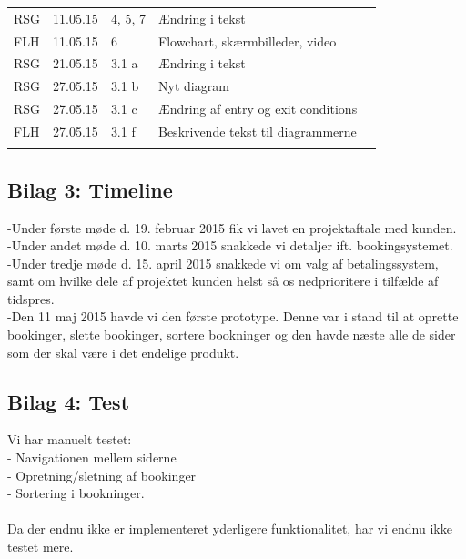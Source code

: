 \documentclass[12pt,a4paper]{article}
\begin{document}
\begin{table}[h]
\begin{tabular}{lllll}
\multicolumn{1}{|l|}{RSG}     & \multicolumn{1}{l|}{11.05.15}     & \multicolumn{1}{l|}{4, 5, 7}       & \multicolumn{1}{l|}{Ændring i tekst}        &  \\ \cline{1-4}
\multicolumn{1}{|l|}{FLH}     & \multicolumn{1}{l|}{11.05.15}     & \multicolumn{1}{l|}{6}       & \multicolumn{1}{l|}{Flowchart, skærmbilleder, video}        &  \\ \cline{1-4}
\multicolumn{1}{|l|}{RSG}     & \multicolumn{1}{l|}{21.05.15}     & \multicolumn{1}{l|}{3.1 a}       & \multicolumn{1}{l|}{Ændring i tekst}        &  \\ \cline{1-4}
\multicolumn{1}{|l|}{RSG}     & \multicolumn{1}{l|}{27.05.15}     & \multicolumn{1}{l|}{3.1 b}       & \multicolumn{1}{l|}{Nyt diagram}        &  \\ \cline{1-4}
\multicolumn{1}{|l|}{RSG}     & \multicolumn{1}{l|}{27.05.15}     & \multicolumn{1}{l|}{3.1 c}       & \multicolumn{1}{l|}{Ændring af entry og exit conditions}        &  \\ \cline{1-4}
\multicolumn{1}{|l|}{FLH}     & \multicolumn{1}{l|}{27.05.15}     & \multicolumn{1}{l|}{3.1 f}       & \multicolumn{1}{l|}{Beskrivende tekst til diagrammerne}        &  \\ \cline{1-4}
                           &                           &                             &                              & 
\end{tabular}
\end{table}
\subsection{Bilag 3: Timeline}
-Under første møde d. 19. februar 2015 fik vi lavet en projektaftale med kunden.\\
-Under andet møde d. 10. marts 2015 snakkede vi detaljer ift. bookingsystemet.\\
-Under tredje møde d. 15. april 2015 snakkede vi om valg af betalingssystem, samt om hvilke dele
af projektet kunden helst så os nedprioritere i tilfælde af tidspres.\\
-Den 11 maj 2015 havde vi den første prototype. Denne var i stand til at
oprette bookinger, slette bookinger, sortere bookninger og den havde næste
 alle de sider som der skal være i det endelige produkt.
\subsection{Bilag 4: Test}
Vi har manuelt testet:\\
- Navigationen mellem siderne\\
- Opretning/sletning af bookinger\\
- Sortering i bookninger.\\
\\
Da der endnu ikke er implementeret yderligere funktionalitet,
har vi endnu ikke testet mere.
\end{document}
